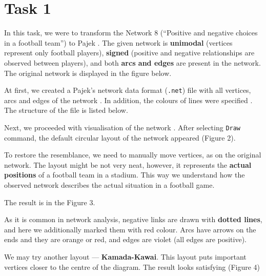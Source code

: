 \section{Task 1}
In this task, we were to transform the Network 8 (“Positive and negative choices in a football team”) to Pajek \cite{Pfeffer2019}. The given network is \textbf{unimodal} (vertices represent only football players), \textbf{signed} (positive and negative relationships are observed between players), and both \textbf{arcs and edges} are present in the network. The original network is displayed in the figure below.


At first, we created a Pajek’s network data format (\texttt{.net}) file with all vertices, arcs and edges of the network \cite{batagelj_ppt_2002}. In addition, the colours of lines were specified \cite{manual2022}. The structure of the file is listed below.



Next, we proceeded with visualisation of the network \cite{pajek_workshop}. After selecting \texttt{Draw} command, the default circular layout of the network appeared (Figure 2). 


To restore the resemblance, we need to manually move vertices, as on the original network. The layout might be not very neat, however, it represents the \textbf{actual positions} of a football team in a stadium. This way we understand how the observed network describes the actual situation in a football game. 

The result is in the Figure 3.


As it is common in network analysis, negative links are drawn with \textbf{dotted lines}, and here we additionally marked them with red colour. Arcs have arrows on the ends and they are orange or red, and edges are violet (all edges are positive).

We may try another layout — \textbf{Kamada-Kawai}. This layout puts important vertices closer to the centre of the diagram. The result looks satisfying (Figure 4)


\clearpage



